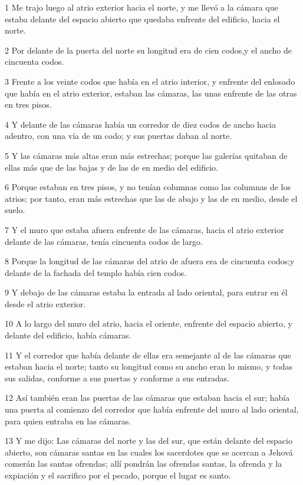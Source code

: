 \par 1 Me trajo luego al atrio exterior hacia el norte, y me llevó a la cámara que estaba delante del espacio abierto que quedaba enfrente del edificio, hacia el norte.
\par 2 Por delante de la puerta del norte su longitud era de cien codos,y el ancho de cincuenta codos.
\par 3 Frente a los veinte codos que había en el atrio interior, y enfrente del enlosado que había en el atrio exterior, estaban las cámaras, las unas enfrente de las otras en tres pisos.
\par 4 Y delante de las cámaras había un corredor de diez codos de ancho hacia adentro, con una vía de un codo; y sus puertas daban al norte.
\par 5 Y las cámaras más altas eran más estrechas; porque las galerías quitaban de ellas más que de las bajas y de las de en medio del edificio.
\par 6 Porque estaban en tres pisos, y no tenían columnas como las columnas de los atrios; por tanto, eran más estrechas que las de abajo y las de en medio, desde el suelo.
\par 7 Y el muro que estaba afuera enfrente de las cámaras, hacia el atrio exterior delante de las cámaras, tenía cincuenta codos de largo.
\par 8 Porque la longitud de las cámaras del atrio de afuera era de cincuenta codos;y delante de la fachada del templo había cien codos.
\par 9 Y debajo de las cámaras estaba la entrada al lado oriental, para entrar en él desde el atrio exterior.
\par 10 A lo largo del muro del atrio, hacia el oriente, enfrente del espacio abierto, y delante del edificio, había cámaras.
\par 11 Y el corredor que había delante de ellas era semejante al de las cámaras que estaban hacia el norte; tanto su longitud como su ancho eran lo mismo, y todas sus salidas, conforme a sus puertas y conforme a sus entradas.
\par 12 Así también eran las puertas de las cámaras que estaban hacia el sur; había una puerta al comienzo del corredor que había enfrente del muro al lado oriental, para quien entraba en las cámaras.
\par 13 Y me dijo: Las cámaras del norte y las del sur, que están delante del espacio abierto, son cámaras santas en las cuales los sacerdotes que se acercan a Jehová comerán las santas ofrendas; allí pondrán las ofrendas santas, la ofrenda y la expiación y el sacrifico por el pecado, porque el lugar es santo.

